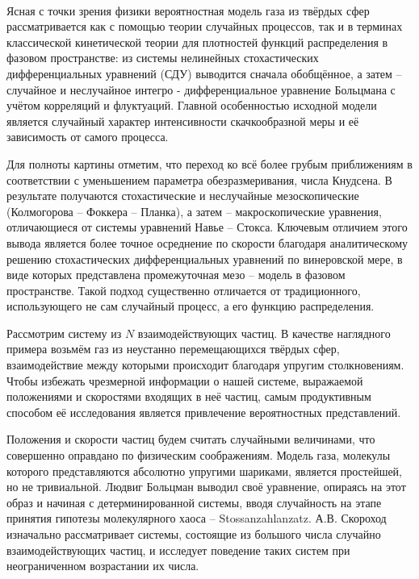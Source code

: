 \documentclass{vzmsthesis}
\begin{document}
\
\vzmscaption



Ясная с точки зрения физики вероятностная модель газа из твёрдых сфер рассматривается как с помощью теории случайных процессов, так и в терминах классической кинетической теории для плотностей функций распределения в фазовом пространстве: из системы нелинейных  стохастических дифференциальных уравнений (СДУ) выводится сначала обобщённое, а затем -- случайное и неслучайное интегро - дифференциальное уравнение Больцмана с учётом корреляций и флуктуаций. Главной особенностью исходной модели является случайный характер интенсивности скачкообразной меры и её зависимость от самого процесса.

Для полноты картины  отметим, что переход ко всё более грубым приближениям  в соответствии с уменьшением параметра обезразмеривания,  числа Кнудсена. В результате получаются стохастические и неслучайные мезоскопические (Колмогорова -- Фоккера -- Планка), а затем -- макроскопические уравнения, отличающиеся от  системы уравнений Навье -- Стокса. Ключевым отличием этого вывода является  более точное осреднение по скорости  благодаря  аналитическому решению стохастических дифференциальных уравнений по винеровской мере, в виде которых  представлена промежуточная мезо -- модель в фазовом пространстве. Такой подход существенно отличается от традиционного, использующего не сам случайный процесс, а его функцию распределения. 

Рассмотрим систему из $N$ взаимодействующих частиц. В качестве наглядного примера возьмём газ из неустанно перемещающихся твёрдых сфер, взаимодействие между которыми происходит благодаря упругим столкновениям. Чтобы избежать чрезмерной информации  о нашей системе, выражаемой положениями и скоростями входящих в неё частиц, самым продуктивным способом её исследования является привлечение вероятностных представлений.


Положения и скорости частиц будем считать случайными величинами, что совершенно оправдано по  физическим соображениям.
Модель газа, молекулы которого представляются абсолютно упругими шариками, является простейшей, но не
тривиальной. Людвиг Больцман выводил своё
уравнение, опираясь на этот образ и начиная с детерминированной системы, вводя случайность на этапе принятия гипотезы молекулярного хаоса – Stossanzahlanzatz.
А.В. Скороход изначально рассматривает системы, состоящие из большого числа случайно взаимодействующих
частиц, и исследует поведение таких систем при неограниченном возрастании их числа. 
\end{document}
